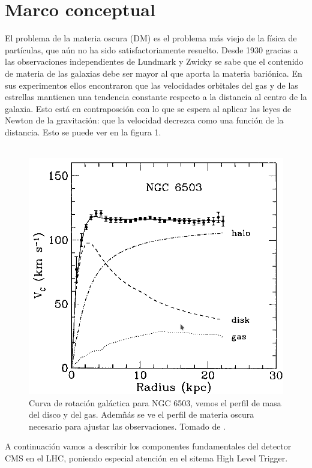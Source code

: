 \section{Marco conceptual}
El problema de la materia oscura (DM) es el problema más viejo de la física de partículas, que aún no ha sido satisfactoriamente resuelto. Desde 1930 gracias a las observaciones independientes de Lundmark y Zwicky \cite{ARTICLE:1,ARTICLE:2} se sabe que el contenido de materia de las galaxias debe ser mayor al que aporta la materia bariónica. En sus experimentos ellos encontraron que las velocidades orbitales del gas y de las estrellas mantienen una tendencia constante respecto a la distancia al centro de la galaxia.
 Esto está en contraposción con lo que se espera al aplicar las leyes de Newton de la gravitación: que la velocidad decrezca como una función de la distancia. Esto se puede ver en la figura 1.
\\
\\
\begin{figure}
\centering
\includegraphics[width=12cm]{F1.png}
\caption{\label{fig:frog} Curva de rotación galáctica para NGC 6503, vemos el perfil de masa del disco y del gas. Ademñás se ve el perfil de materia oscura necesario para ajustar las observaciones. Tomado de \cite{Freese:2017idy}.}
\end{figure}
A continuación vamos a describir los componentes fundamentales del detector CMS en el LHC, poniendo especial atención en el sitema High Level Trigger.


\label{sec:examples}

